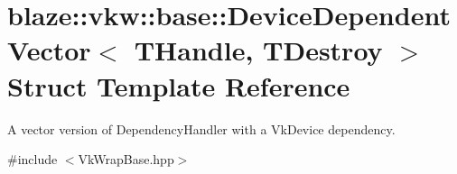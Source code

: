 \hypertarget{structblaze_1_1vkw_1_1base_1_1DeviceDependentVector}{}\section{blaze\+:\+:vkw\+:\+:base\+:\+:Device\+Dependent\+Vector$<$ T\+Handle, T\+Destroy $>$ Struct Template Reference}
\label{structblaze_1_1vkw_1_1base_1_1DeviceDependentVector}


A vector version of Dependency\+Handler with a Vk\+Device dependency.  




{\ttfamily \#include $<$Vk\+Wrap\+Base.\+hpp$>$}

